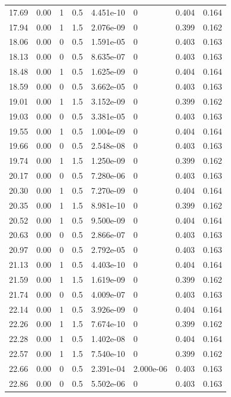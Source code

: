 \documentclass[preview]{standalone}
\begin{document}
{{{\begin{tabular}{L{1.2cm}C{1.2cm} C{0.3cm}C{0.5cm} C{1.4cm}C{1.4cm} C{1.4cm}C{1.4cm}}
  17.69  &  0.00  & 1     & 0.5 &  4.451e-10  & 0  & 0.404 &  0.164   \\ 
  17.94  &  0.00  & 1     & 1.5 &  2.076e-09  & 0  & 0.399 &  0.162   \\ 
  18.06  &  0.00  & 0     & 0.5 &  1.591e-05  & 0  & 0.403 &  0.163   \\ 
  18.13  &  0.00  & 0     & 0.5 &  8.635e-07  & 0  & 0.403 &  0.163   \\ 
  18.48  &  0.00  & 1     & 0.5 &  1.625e-09  & 0  & 0.404 &  0.164   \\ 
  18.59  &  0.00  & 0     & 0.5 &  3.662e-05  & 0  & 0.403 &  0.163   \\ 
  19.01  &  0.00  & 1     & 1.5 &  3.152e-09  & 0  & 0.399 &  0.162   \\ 
  19.03  &  0.00  & 0     & 0.5 &  3.381e-05  & 0  & 0.403 &  0.163   \\ 
  19.55  &  0.00  & 1     & 0.5 &  1.004e-09  & 0  & 0.404 &  0.164   \\ 
  19.66  &  0.00  & 0     & 0.5 &  2.548e-08  & 0  & 0.403 &  0.163   \\ 
  19.74  &  0.00  & 1     & 1.5 &  1.250e-09  & 0  & 0.399 &  0.162   \\ 
  20.17  &  0.00  & 0     & 0.5 &  7.280e-06  & 0  & 0.403 &  0.163   \\ 
  20.30  &  0.00  & 1     & 0.5 &  7.270e-09  & 0  & 0.404 &  0.164   \\ 
  20.35  &  0.00  & 1     & 1.5 &  8.981e-10  & 0  & 0.399 &  0.162   \\ 
  20.52  &  0.00  & 1     & 0.5 &  9.500e-09  & 0  & 0.404 &  0.164   \\ 
  20.63  &  0.00  & 0     & 0.5 &  2.866e-07  & 0  & 0.403 &  0.163   \\ 
  20.97  &  0.00  & 0     & 0.5 &  2.792e-05  & 0  & 0.403 &  0.163   \\ 
  21.13  &  0.00  & 1     & 0.5 &  4.403e-10  & 0  & 0.404 &  0.164   \\ 
  21.59  &  0.00  & 1     & 1.5 &  1.619e-09  & 0  & 0.399 &  0.162   \\ 
  21.74  &  0.00  & 0     & 0.5 &  4.009e-07  & 0  & 0.403 &  0.163   \\ 
  22.14  &  0.00  & 1     & 0.5 &  3.926e-09  & 0  & 0.404 &  0.164   \\ 
  22.26  &  0.00  & 1     & 1.5 &  7.674e-10  & 0  & 0.399 &  0.162   \\ 
  22.28  &  0.00  & 1     & 0.5 &  1.402e-08  & 0  & 0.404 &  0.164   \\ 
  22.57  &  0.00  & 1     & 1.5 &  7.540e-10  & 0  & 0.399 &  0.162   \\ 
  22.66  &  0.00  & 0     & 0.5 &  2.391e-04  & 2.000e-06  & 0.403 &  0.163   \\ 
  22.86  &  0.00  & 0     & 0.5 &  5.502e-06  & 0  & 0.403 &  0.163   \\ 
\hline 
\end{tabular} 

}}}
\end{document}
